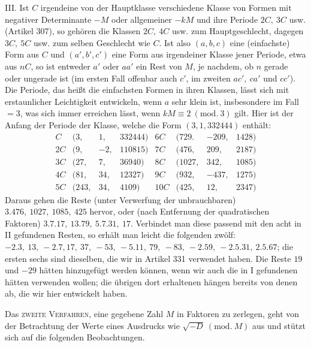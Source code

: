 III. Ist \(C\) irgendeine von der Hauptklasse verschiedene Klasse von Formen mit negativer Determinante \(-M\) oder allgemeiner \(-kM\) und ihre Periode \(2C,\allowbreak \ 3C\) usw. (Artikel 307), so gehören die Klassen \(2C,\allowbreak \ 4C\) usw. zum Hauptgeschlecht, dagegen \(3C,\allowbreak \ 5C\) usw. zum selben Geschlecht wie \(C\). Ist also \((a,\allowbreak b,\allowbreak c)\) eine (einfachste) Form aus \(C\) und \((a',\allowbreak b',\allowbreak c')\) eine Form aus irgendeiner Klasse jener Periode, etwa aus \(nC\), so ist entweder \(a'\) oder \(aa'\) ein Rest von \(M\), je nachdem, ob \(n\) gerade oder ungerade ist (im ersten Fall offenbar auch \(c'\), im zweiten \(ac',\allowbreak \ ca'\) und \(cc'\)). Die Periode, das heißt die einfachsten Formen in ihren Klassen, lässt sich mit erstaunlicher Leichtigkeit entwickeln, wenn \(a\) sehr klein ist, insbesondere im Fall \(=3\), was sich immer erreichen lässt, wenn \(kM\equiv2\ (\mathrm{mod.}\ 3)\) gilt. Hier ist der Anfang der Periode der Klasse, welche die Form \((3,\allowbreak 1,\allowbreak 332444)\) enthält:
\[\begin{array}{crrr|crrr}C&\bigl(3,&1,&332444\bigr)&6C&\bigl(729.&-209,&1428\bigr)\\ 2C&\bigl(9,&-2,&110815\bigr)&7C&\bigl(476,&209,&2187\bigr)\\ 3C&\bigl(27,&7,&36940\bigr)&8C&\bigl(1027,&342,&1085\bigr)\\ 4C&\bigl(81,&34,&12327\bigr)&9C&\bigl(932,&-437,&1275\bigr)\\ 5C&\bigl(243,&34,&4109\bigr)&10C&\bigl(425,&12,&2347\bigr)\end{array}\] Daraus gehen die Reste (unter Verwerfung der unbrauchbaren) \(3.476,\allowbreak \ 1027,\allowbreak \ 1085,\allowbreak \ 425\) hervor, oder (nach Entfernung der quadratischen Faktoren) \(3.7.17,\allowbreak \ 13.79,\allowbreak \ 5.7.31,\allowbreak \ 17\). Verbindet man diese passend mit den acht in II gefundenen Resten, so erhält man leicht die folgenden zwölf: \(-2.3,\allowbreak \ 13,\allowbreak \ -2.7,\allowbreak 17,\allowbreak \ 37,\allowbreak \ -53,\allowbreak \ -5.11,\allowbreak \ 79,\allowbreak \ -83,\allowbreak \ -2.59,\allowbreak \ -2.5.31,\allowbreak \ 2.5.67\); die ersten sechs sind dieselben, die wir in Artikel 331 verwendet haben. Die Reste \(19\) und \(-29\) hätten hinzugefügt werden können, wenn wir auch die in I gefundenen hätten verwenden wollen; die übrigen dort erhaltenen hängen bereits von denen ab, die wir hier entwickelt haben.

Das \textsc{zweite Verfahren}, eine gegebene Zahl \(M\) in Faktoren zu zerlegen, geht von der Betrachtung der Werte eines Ausdrucks wie \(\surd{-D}\ (\mathrm{mod.}\ M)\) aus und stützt sich auf die folgenden Beobachtungen.


